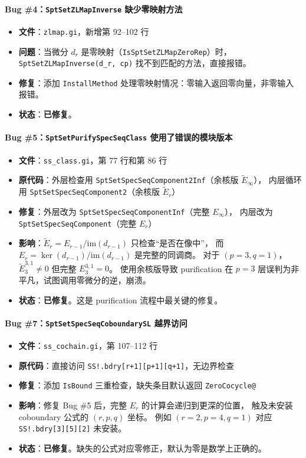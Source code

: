 \documentclass[a4paper,fontset=ubuntu,12pt]{ctexart}
\begin{document}
\paragraph{Bug \#4：\texttt{SptSetZLMapInverse} 缺少零映射方法}
\begin{itemize}
\item \textbf{文件}：\texttt{zlmap.gi}，新增第 92--102 行
\item \textbf{问题}：当微分 $d_r$ 是零映射（\texttt{IsSptSetZLMapZeroRep}）时，
  \texttt{SptSetZLMapInverse(d\_r, cp)} 找不到匹配的方法，直接报错。
\item \textbf{修复}：添加 \texttt{InstallMethod} 处理零映射情况：零输入返回零向量，非零输入报错。
\item \textbf{状态}：\textbf{已修复}。
\end{itemize}

\paragraph{Bug \#5：\texttt{SptSetPurifySpecSeqClass} 使用了错误的模块版本}
\begin{itemize}
\item \textbf{文件}：\texttt{ss\_class.gi}，第 77 行和第 86 行
\item \textbf{原代码}：外层检查用 \texttt{SptSetSpecSeqComponent2Inf}（余核版 $\tilde{E}_\infty$），
  内层循环用 \texttt{SptSetSpecSeqComponent2}（余核版 $\tilde{E}_r$）
\item \textbf{修复}：外层改为 \texttt{SptSetSpecSeqComponentInf}（完整 $E_\infty$），
  内层改为 \texttt{SptSetSpecSeqComponent}（完整 $E_r$）
\item \textbf{影响}：$\tilde{E}_r = E_{r-1} / \mathrm{im}(d_{r-1})$ 只检查``是否在像中''，
  而 $E_r = \ker(d_{r-1}) / \mathrm{im}(d_{r-1})$ 是完整的同调商。
  对于 $(p=3, q=1)$，$\tilde{E}_3^{3,1} \neq 0$ 但完整 $E_3^{3,1} = 0$。
  使用余核版导致 purification 在 $p=3$ 层误判为非平凡，试图调用零微分的逆，崩溃。
\item \textbf{状态}：\textbf{已修复}。这是 purification 流程中最关键的修复。
\end{itemize}

\paragraph{Bug \#7：\texttt{SptSetSpecSeqCoboundarySL} 越界访问}
\begin{itemize}
\item \textbf{文件}：\texttt{ss\_cochain.gi}，第 107--112 行
\item \textbf{原代码}：直接访问 \texttt{SS!.bdry[r+1][p+1][q+1]}，无边界检查
\item \textbf{修复}：添加 \texttt{IsBound} 三重检查，缺失条目默认返回 \texttt{ZeroCocycle@}
\item \textbf{影响}：修复 Bug \#5 后，完整 $E_r$ 的计算会递归到更深的位置，
  触及未安装 coboundary 公式的 $(r, p, q)$ 坐标。
  例如 $(r=2, p=4, q=1)$ 对应 \texttt{SS!.bdry[3][5][2]} 未安装。
\item \textbf{状态}：\textbf{已修复}。缺失的公式对应零修正，默认为零是数学上正确的。
\end{itemize}
\end{document}
